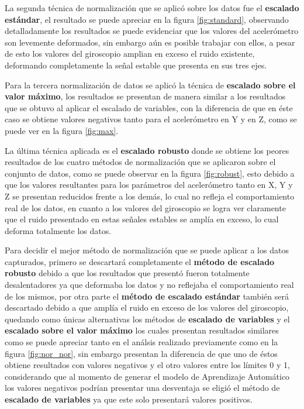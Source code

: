 \vspace{5mm} %

La segunda t\'{e}cnica de normalizaci\'{o}n que se aplic\'{o} sobre los datos fue el \textbf{escalado est\'{a}ndar}, el resultado se puede apreciar en la figura \ref{fig:standard}, observando detalladamente los resultados se puede evidenciar que los valores del aceler\'{o}metro son levemente deformados, sin embargo a\'{u}n es posible trabajar con ellos, a pesar de esto los valores del giroscopio amplian en exceso el ruido existente, deformando completamente la se\~{n}al estable que presenta en sus tres ejes.

\vspace{5mm} %

Para la tercera normalizaci\'{o}n de datos se aplic\'{o} la t\'{e}cnica de \textbf{escalado sobre el valor m\'{a}ximo}, los resultados se presentan de manera similar a los resultados que  se obtuvo al aplicar el escalado de variables, con la diferencia de que en \'{e}ste caso se obtiene valores negativos tanto para el aceler\'{o}metro en Y y en Z, como se puede ver en la figura \ref{fig:max}.

\vspace{5mm} %

La \'{u}ltima t\'{e}cnica aplicada es el \textbf{escalado robusto} donde se obtiene los peores resultados de los cuatro m\'{e}todos de normalizaci\'{o}n que se aplicaron sobre el conjunto de datos, como se puede observar en la figura \ref{fig:robust}, esto debido a que los valores resultantes para los par\'{a}metros del aceler\'{o}metro tanto en X, Y y Z se presentan reducidos frente a los dem\'{a}s, lo cual no refleja el comportamiento real de los datos, en cuanto a los valores del giroscopio se logra ver claramente que el ruido presentado en estas se\~{n}ales estables se ampl\'{i}a en exceso, lo cual deforma totalmente los datos.

\vspace{5mm} %

Para decidir el mejor m\'{e}todo de normalizaci\'{o}n que se puede aplicar a los datos capturados, primero se descartar\'{a} completamente el \textbf{m\'{e}todo de escalado robusto} debido a que los resultados que present\'{o} fueron totalmente desalentadores ya que deformaba los datos y no reflejaba el comportamiento real de los mismos, por otra parte el \textbf{m\'{e}todo de escalado est\'{a}ndar} tambi\'{e}n ser\'{a} descartado debido a que ampl\'{i}a el ruido en exceso de los valores del giroscopio, quedando como \'{u}nicas alternativas los m\'{e}todos de \textbf{escalado de variables} y el \textbf{escalado sobre el valor m\'{a}ximo} los cuales presentan resultados similares como se puede apreciar tanto en el an\'{a}lsis realizado previamente como en la figura \ref{fig:nor_nor}, sin embargo presentan la diferencia de que uno de \'{e}stos obtiene resultados con valores negativos y el otro valores entre los l\'{i}mites 0 y 1, considerando que al momento de generar el modelo de Aprendizaje Autom\'{a}tico los valores negativos podr\'{i}an presentar una desventaja se eligi\'{o} el m\'{e}todo de \textbf{escalado de variables} ya que este solo presentar\'{a} valores positivos.

